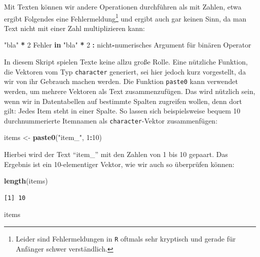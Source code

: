 \documentclass[12pt,]{tufte-book}
\newenvironment{Shaded}{\begin{snugshade}}{\end{snugshade}}
\newcommand{\KeywordTok}[1]{\textcolor[rgb]{0.13,0.29,0.53}{\textbf{#1}}}
\newcommand{\DecValTok}[1]{\textcolor[rgb]{0.00,0.00,0.81}{#1}}
\newcommand{\StringTok}[1]{\textcolor[rgb]{0.31,0.60,0.02}{#1}}
\newcommand{\ControlFlowTok}[1]{\textcolor[rgb]{0.13,0.29,0.53}{\textbf{#1}}}
\newcommand{\OperatorTok}[1]{\textcolor[rgb]{0.81,0.36,0.00}{\textbf{#1}}}
\newcommand{\NormalTok}[1]{#1}
\theoremstyle{definition}
\theoremstyle{definition}
\theoremstyle{definition}
\theoremstyle{remark}
\begin{document}
Mit Texten können wir andere Operationen durchführen als mit Zahlen,
etwa ergibt Folgendes eine Fehlermeldung\footnote{Leider sind
  Fehlermeldungen in \texttt{R} oftmals sehr kryptisch und gerade für
  Anfänger schwer verständlich.} und ergibt auch gar keinen Sinn, da man
Text nicht mit einer Zahl multiplizieren kann:

\begin{Shaded}
\begin{Highlighting}[]
\StringTok{"bla"} \OperatorTok{*}\StringTok{ }\DecValTok{2}
\NormalTok{Fehler }\ControlFlowTok{in} \StringTok{"bla"} \OperatorTok{*}\StringTok{ }\DecValTok{2} \OperatorTok{:}\StringTok{ }\NormalTok{nicht}\OperatorTok{-}\NormalTok{numerisches Argument}
\NormalTok{für binären Operator}
\end{Highlighting}
\end{Shaded}

In diesem Skript spielen Texte keine allzu große Rolle. Eine nützliche
Funktion, die Vektoren vom Typ \texttt{character} generiert, sei hier
jedoch kurz vorgestellt, da wir von ihr Gebrauch machen werden. Die
Funktion \texttt{paste0} kann verwendet werden, um mehrere Vektoren als
Text zusammenzufügen. Das wird nützlich sein, wenn wir in Datentabellen
auf bestimmte Spalten zugreifen wollen, denn dort gilt: Jedes Item steht
in einer Spalte. So lassen sich beispielsweise bequem 10
durchnummerierte Itemnamen als \texttt{character}-Vektor zusammenfügen:

\begin{Shaded}
\begin{Highlighting}[]
\NormalTok{items <-}\StringTok{ }\KeywordTok{paste0}\NormalTok{(}\StringTok{"item_"}\NormalTok{, }\DecValTok{1}\OperatorTok{:}\DecValTok{10}\NormalTok{)}
\end{Highlighting}
\end{Shaded}

Hierbei wird der Text ``item\_'' mit den Zahlen von 1 bis 10 gepaart.
Das Ergebnis ist ein 10-elementiger Vektor, wie wir auch so überprüfen
können:

\begin{Shaded}
\begin{Highlighting}[]
\KeywordTok{length}\NormalTok{(items)}
\end{Highlighting}
\end{Shaded}

\begin{verbatim}
[1] 10
\end{verbatim}

\begin{Shaded}
\begin{Highlighting}[]
\NormalTok{items}
\end{Highlighting}
\end{Shaded}
\end{document}
